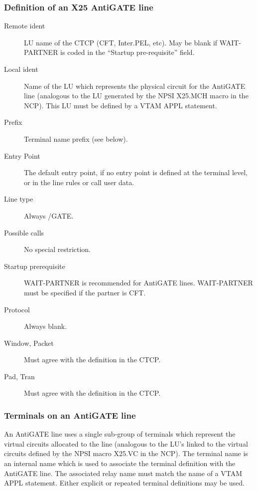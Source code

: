\documentclass[letterpaper,10pt,english]{sphinxmanual}
\begin{document}
\subsubsection{Definition of an X25 AntiGATE line}
\label{\detokenize{connectivity_guide:definition-of-an-x25-antigate-line}}\begin{description}
\item[{Remote ident}] \leavevmode
LU name of the CTCP (CFT, Inter.PEL, etc). May be blank if
WAIT-PARTNER is coded in the “Startup pre-requisite” field.

\item[{Local ident}] \leavevmode
Name of the LU which represents the physical circuit for the
AntiGATE line (analogous to the LU generated by the NPSI X25.MCH
macro in the NCP). This LU must be defined by a VTAM APPL statement.

\item[{Prefix}] \leavevmode
Terminal name prefix (see below).

\item[{Entry Point}] \leavevmode
The default entry point, if no entry point is defined at the
terminal level, or in the line rules or call user data.

\item[{Line type}] \leavevmode
Always /GATE.

\item[{Possible calls}] \leavevmode
No special restriction.

\item[{Startup prerequisite}] \leavevmode
WAIT-PARTNER is recommended for AntiGATE lines. WAIT-PARTNER must be
specified if the partner is CFT.

\item[{Protocol}] \leavevmode
Always blank.

\item[{Window, Packet}] \leavevmode
Must agree with the definition in the CTCP.

\item[{Pad, Tran}] \leavevmode
Must agree with the definition in the CTCP.

\end{description}


\subsubsection{Terminals on an AntiGATE line}
\label{\detokenize{connectivity_guide:terminals-on-an-antigate-line}}
An AntiGATE line uses a single sub-group of terminals which represent the virtual circuits allocated to the line (analogous to the LU’s linked to the virtual circuits defined by the NPSI macro X25.VC in the NCP). The terminal name is an internal name which is used to associate the terminal definition with the AntiGATE line. The associated relay name must match the name of a VTAM APPL statement. Either explicit or repeated terminal definitions may be used.
\end{document}
